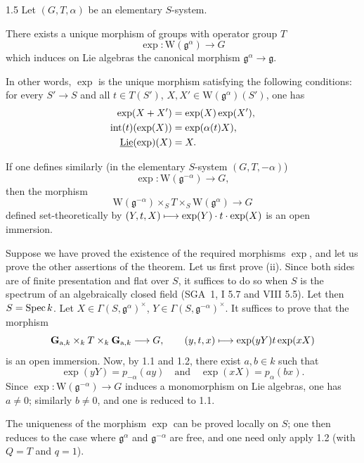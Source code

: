 \begin{theorem}{1.5}\label{XX.1.5}
Let $(G,T,\alpha)$ be an elementary $S$-system.
\begin{enumeratei}
\item There exists a unique morphism of groups with operator group $T$
\[
\exp:\mathrm W(\mathfrak g^\alpha)\to G
\]
which induces on Lie algebras the canonical morphism $\mathfrak g^\alpha\to\mathfrak g$.{\renewcommand{\thefootnote}{(2)}}

In other words, $\exp$ is the unique morphism satisfying the following conditions: for every $S'\to S$ and all $t\in T(S')$, $X,X'\in\mathrm W(\mathfrak g^\alpha)(S')$, one has
\[
\begin{aligned}
\exp(X+X')&=\exp(X)\exp(X'),\\
\operatorname{int}(t)(\exp(X))&=\exp(\alpha(t)X),\\
\underline{\operatorname{Lie}}(\exp)(X)&=X.
\end{aligned}
\]
\item If one defines similarly (in the elementary $S$-system $(G,T,-\alpha)$)
\[
\exp:\mathrm W(\mathfrak g^{-\alpha})\to G,
\]
then the morphism
\[
\mathrm W(\mathfrak g^{-\alpha})\mathbin{\times_S}T\mathbin{\times_S}\mathrm W(\mathfrak g^\alpha)\to G
\]
defined set-theoretically by $(Y,t,X)\longmapsto\exp(Y)\cdot t\cdot\exp(X)$ is an open immersion.
\end{enumeratei}
\end{theorem}
Suppose we have proved the existence of the required morphisms $\exp$, and let us prove the other assertions of the theorem. Let us first prove (ii). Since both sides are of finite presentation and flat over $S$, it suffices to do so when $S$ is the spectrum of an algebraically closed field (SGA~1, I 5.7 and VIII 5.5). Let then $S=\operatorname{Spec} k$. Let $X\in\Gamma(S,\mathfrak g^\alpha)^\times$, $Y\in\Gamma(S,\mathfrak g^{-\alpha})^\times$. It suffices to prove that the morphism
\[
\mathbf G_{\mathrm a,k}\mathbin{\times_k}T\mathbin{\times_k}\mathbf G_{\mathrm a,k}\longrightarrow G,\qquad
(y,t,x)\longmapsto\exp(yY)t\exp(xX)
\]
is an open immersion. Now, by 1.1 and 1.2, there exist $a,b\in k$ such that
\[
\exp(yY)=p_{-\alpha}(ay)\quad\text{and}\quad\exp(xX)=p_\alpha(bx).
\]
Since $\exp:\mathrm W(\mathfrak g^{-\alpha})\to G$ induces a monomorphism on Lie algebras, one has $a\ne0$; similarly $b\ne0$, and one is reduced to 1.1.

The uniqueness of the morphism $\exp$ can be proved locally on $S$; one then reduces to the case where $\mathfrak g^\alpha$ and $\mathfrak g^{-\alpha}$ are free, and one need only apply 1.2 (with $Q=T$ and $q=1$).

